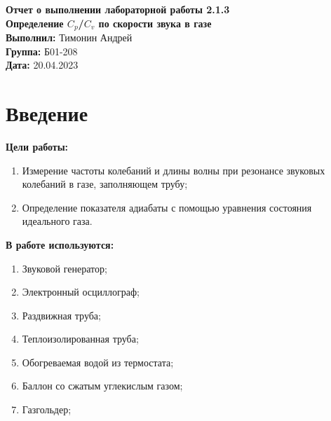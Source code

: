 \documentclass[a4paper, 12pt]{article}
\begin{document}
	\begin{Huge}
		\begin{center}
			\textbf{Отчет о выполнении лабораторной работы 2.1.3}\\
			\vspace{2em}
			\textbf{Определение $C_p$/$C_v$ по скорости звука в газе}\\
			\vspace{5em}
			\textbf{Выполнил: }Тимонин Андрей\\
			\textbf{Группа: }Б01-208\\
			\vspace{9em}
			\textbf{Дата: }20.04.2023\\
		\end{center}
	\end{Huge}
	
	\section{Введение}
	\noindent\textbf{Цели работы:}
	\begin{enumerate}
		\item Измерение частоты колебаний и длины волны при резонансе звуковых колебаний в газе, заполняющем трубу;
		\item Определение показателя адиабаты с помощью уравнения состояния идеального газа.
	\end{enumerate}
	\bigskip
	
	\noindent\textbf{В работе используются:}
	\begin{enumerate}
		\item Звуковой генератор;
		\item Электронный осциллограф;
		\item Раздвижная труба;
		\item Теплоизолированная труба;
		\item Обогреваемая водой из термостата;
		\item Баллон со сжатым углекислым газом;
		\item Газгольдер;
	\end{enumerate}
\end{document}
